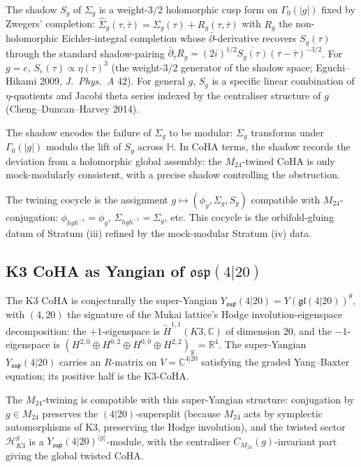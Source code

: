The shadow $S_g$ of $\Sigma_g$ is a weight-$3/2$ holomorphic cusp form on $\Gamma_0(|g|)$ fixed by Zwegers' completion: $\widehat\Sigma_g(\tau, \bar\tau) = \Sigma_g(\tau) + R_g(\tau, \bar\tau)$ with $R_g$ the non-holomorphic Eichler-integral completion whose $\bar\partial$-derivative recovers $S_g(\tau)$ through the standard shadow-pairing $\bar\partial_{\bar\tau} R_g = (2i)^{1/2} \overline{S_g(\tau)} (\tau - \bar\tau)^{-3/2}$. For $g = e$, $S_e(\tau) \propto \eta(\tau)^3$ (the weight-$3/2$ generator of the shadow space; Eguchi--Hikami 2009, \emph{J.\ Phys.\ A} 42). For general $g$, $S_g$ is a specific linear combination of $\eta$-quotients and Jacobi theta series indexed by the centraliser structure of $g$ (Cheng--Duncan--Harvey 2014).

The shadow encodes the failure of $\Sigma_g$ to be modular: $\Sigma_g$ transforms under $\Gamma_0(|g|)$ modulo the lift of $S_g$ across $\mathbb{H}$. In CoHA terms, the shadow records the deviation from a holomorphic global assembly: the $M_{24}$-twined CoHA is only mock-modularly consistent, with a precise shadow controlling the obstruction.

The twining cocycle is the assignment $g \mapsto (\phi_g, \Sigma_g, S_g)$ compatible with $M_{24}$-conjugation: $\phi_{hgh^{-1}} = \phi_g$, $\Sigma_{hgh^{-1}} = \Sigma_g$, etc. This cocycle is the orbifold-gluing datum of Stratum (iii) refined by the mock-modular Stratum (iv) data.

\subsection{K3 CoHA as Yangian of \texorpdfstring{$\mathfrak{osp}(4|20)$}{osp(4|20)}}
\label{subsec:k3-super-yangian}

The K3 CoHA is conjecturally the super-Yangian $Y_{\mathfrak{osp}}(4|20) = Y(\mathfrak{gl}(4|20))^\theta$, with $(4, 20)$ the signature of the Mukai lattice's Hodge involution-eigenspace decomposition: the $+1$-eigenspace is $\widetilde{H}^{1,1}(K3, \mathbb{C})$ of dimension $20$, and the $-1$-eigenspace is $(H^{2,0} \oplus H^{0,2} \oplus H^{0,0} \oplus H^{2,2})_{\mathbb{R}} = \mathbb{R}^4$. The super-Yangian $Y_{\mathfrak{osp}}(4|20)$ carries an $R$-matrix on $V = \mathbb{C}^{4|20}$ satisfying the graded Yang--Baxter equation; its positive half is the K3-CoHA.

The $M_{24}$-twining is compatible with this super-Yangian structure: conjugation by $g \in M_{24}$ preserves the $(4|20)$-supersplit (because $M_{24}$ acts by symplectic automorphisms of K3, preserving the Hodge involution), and the twisted sector $\mathcal{H}_{K3}^g$ is a $Y_{\mathfrak{osp}}(4|20)^{\langle g \rangle}$-module, with the centraliser $C_{M_{24}}(g)$-invariant part giving the global twisted CoHA.

